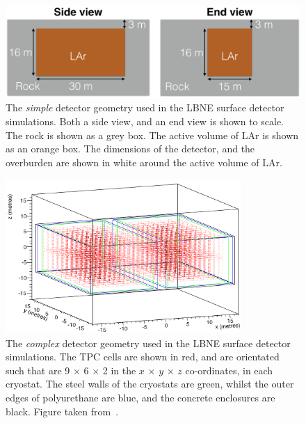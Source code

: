 \begin{figure}[h!]
  \centering
  \includegraphics[width=\textwidth]{SimpleDetector}
  \caption[The \emph{simple} detector geometry used in the LBNE surface detector simulations]
          {The \emph{simple} detector geometry used in the LBNE surface detector simulations. Both a side view, and an end view is shown to scale. The rock is shown as a grey box. The active volume of LAr is shown as an orange box. The dimensions of the detector, and the overburden are shown in white around the active volume of LAr.}
  \label{fig:SurfSimpGeom}
\end{figure}

\begin{figure}[h!]
  \centering
  \includegraphics[width=0.8\textwidth]{ComplexGeom}
  \caption[The \emph{complex} detector geometry used in the LBNE surface detector simulations]
          {The \emph{complex} detector geometry used in the LBNE surface detector simulations. The TPC cells are shown in red, and are orientated such that are 9 $\times$ 6 $\times$ 2 in the $x$ $\times$ $y$ $\times$ $z$ co-ordinates, in each cryostat. The steel walls of the cryostats are green, whilst the outer edges of polyurethane are blue, and the concrete enclosures are black. Figure taken from~\citep{MartinsThesis}.}
  \label{fig:SurfCompGeom}
\end{figure}

